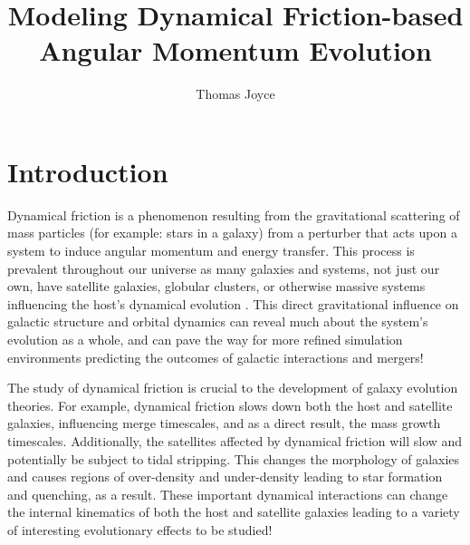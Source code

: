 \documentclass[linenumbers,trackchanges]{aastex7}
\begin{document}
\title{Modeling Dynamical Friction-based Angular Momentum Evolution}


\author{Thomas Joyce}

\section{Introduction} %

\sloppy %

\hspace{\parindent} Dynamical friction is a phenomenon resulting from the gravitational scattering of mass particles (for example: stars in a galaxy) from a perturber that acts upon a system to induce angular momentum and energy transfer. This process is prevalent throughout our universe as many galaxies and systems, not just our own, have satellite galaxies, globular clusters, or otherwise massive systems influencing the host's dynamical evolution \citep{Binney_Tremaine-2008}. This direct gravitational influence on galactic structure and orbital dynamics can reveal much about the system's evolution as a whole, and can pave the way for more refined simulation environments predicting the outcomes of galactic interactions and mergers!

\vspace{10pt}

\hspace{\parindent} The study of dynamical friction is crucial to the development of galaxy evolution theories. For example, dynamical friction slows down both the host and satellite galaxies, influencing merge timescales, and as a direct result, the mass growth timescales. Additionally, the satellites affected by dynamical friction will slow and potentially be subject to tidal stripping. This changes the morphology of galaxies and causes regions of over-density and under-density leading to star formation and quenching, as a result. These important dynamical interactions can change the internal kinematics of both the host and satellite galaxies leading to a variety of interesting evolutionary effects to be studied!

\vspace{10pt}
\end{document}
